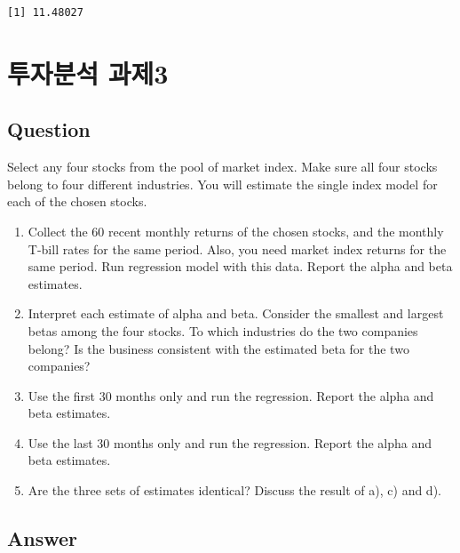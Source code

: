 \documentclass[
  a4paper,
  DIV=11,
  numbers=noendperiod]{scrreprt}
\begin{document}
\begin{verbatim}
[1] 11.48027
\end{verbatim}

\chapter*{투자분석 과제3}\label{uxd22cuxc790uxbd84uxc11d-uxacfcuxc81c3}


\section*{Question}\label{question-6}


Select any four stocks from the pool of market index. Make sure all four
stocks belong to four different industries. You will estimate the single
index model for each of the chosen stocks.

\begin{enumerate}
\def\labelenumi{\alph{enumi})}
\item
  Collect the 60 recent monthly returns of the chosen stocks, and the
  monthly T-bill rates for the same period. Also, you need market index
  returns for the same period. Run regression model with this data.
  Report the alpha and beta estimates.
\item
  Interpret each estimate of alpha and beta. Consider the smallest and
  largest betas among the four stocks. To which industries do the two
  companies belong? Is the business consistent with the estimated beta
  for the two companies?
\item
  Use the first 30 months only and run the regression. Report the alpha
  and beta estimates.
\item
  Use the last 30 months only and run the regression. Report the alpha
  and beta estimates.
\item
  Are the three sets of estimates identical? Discuss the result of a),
  c) and d).
\end{enumerate}

\section*{Answer}\label{answer-11}

\end{document}
